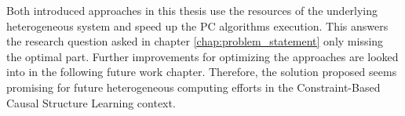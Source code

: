Both introduced approaches in this thesis use the resources of the underlying heterogeneous system and speed up the PC algorithms execution. This answers the research question asked in chapter \ref{chap:problem_statement} only missing the optimal part. Further improvements for optimizing the approaches are looked into in the following future work chapter. Therefore, the solution proposed seems promising for future heterogeneous computing efforts in the Constraint-Based Causal Structure Learning context.
% 
% 
% 
% 
% 
% 